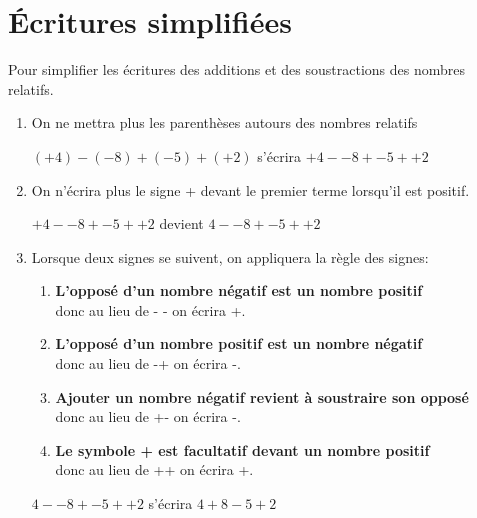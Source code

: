 \section{Écritures simplifiées}
\begin{convention}
    Pour simplifier les écritures des additions et des soustractions des nombres relatifs.
    \begin{enumerate}
    \item On ne mettra plus les parenthèses autours des nombres relatifs
    \begin{center}
    $(+4)-(-8)+(-5)+(+2)$ s'écrira $+4--8+-5++2$
    \end{center}
    \item On n'écrira plus le signe + devant le premier terme lorsqu'il est positif.
    \begin{center}
    $+4--8+-5++2$ devient $4--8+-5++2$
    \end{center}
    \item Lorsque deux signes se suivent, on appliquera la règle des signes:
        \begin{enumerate}
        \item \textbf{L'opposé d'un nombre négatif est un nombre positif} \\ donc au lieu de - - on écrira +.
        \item \textbf{L'opposé d'un nombre positif est un nombre négatif} \\ donc au lieu de -+ on écrira -.
        \item \textbf{Ajouter un nombre négatif revient à soustraire son opposé} \\ donc au lieu de +- on écrira -.
        \item \textbf{Le symbole + est facultatif devant un nombre positif} \\ donc au lieu de ++ on écrira +.
        \end{enumerate}
    \begin{center}
    $4--8+-5++2$ s'écrira $4+8-5+2$
    \end{center}
    \end{enumerate}
    \begin{center}
    \end{center}
\end{convention}

